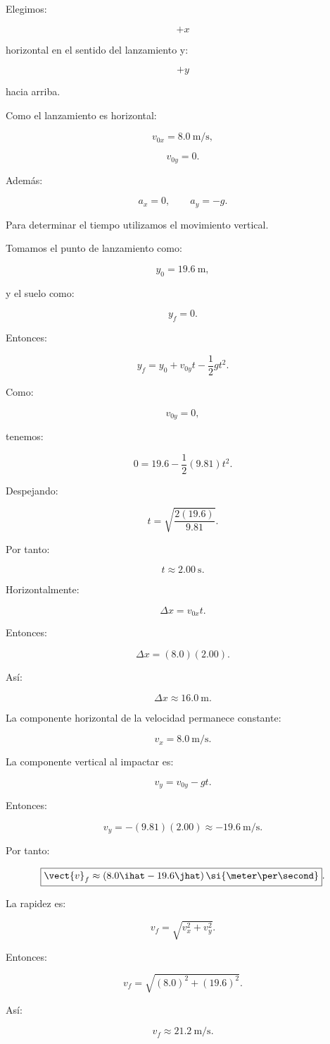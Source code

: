 \begin{explicacion}
Elegimos:

\[
+x
\]

horizontal en el sentido del lanzamiento y:

\[
+y
\]

hacia arriba.

Como el lanzamiento es horizontal:

\[
v_{0x}=\SI{8.0}{\meter\per\second},
\]

\[
v_{0y}=0.
\]

Además:

\[
a_x=0,
\qquad
a_y=-g.
\]

Para determinar el tiempo utilizamos el movimiento vertical.

Tomamos el punto de lanzamiento como:

\[
y_0=\SI{19.6}{\meter},
\]

y el suelo como:

\[
y_f=0.
\]

Entonces:

\[
y_f
=
y_0
+
v_{0y}t
-
\frac{1}{2}gt^2.
\]

Como:

\[
v_{0y}=0,
\]

tenemos:

\[
0
=
19.6
-
\frac{1}{2}(9.81)t^2.
\]

Despejando:

\[
t
=
\sqrt{
\frac{2(19.6)}{9.81}
}.
\]

Por tanto:

\[
\boxed{
t\approx\SI{2.00}{\second}
}.
\]

Horizontalmente:

\[
\Delta x=v_{0x}t.
\]

Entonces:

\[
\Delta x
=
(8.0)(2.00).
\]

Así:

\[
\boxed{
\Delta x\approx\SI{16.0}{\meter}
}.
\]

La componente horizontal de la velocidad permanece constante:

\[
\boxed{
v_x=\SI{8.0}{\meter\per\second}
}.
\]

La componente vertical al impactar es:

\[
v_y
=
v_{0y}-gt.
\]

Entonces:

\[
v_y
=
-(9.81)(2.00)
\approx
-\SI{19.6}{\meter\per\second}.
\]

Por tanto:

\[
\boxed{
\vect{v}_f
\approx
(8.0\ihat-19.6\jhat)
\,\si{\meter\per\second}
}.
\]

La rapidez es:

\[
v_f
=
\sqrt{
v_x^2+v_y^2
}.
\]

Entonces:

\[
v_f
=
\sqrt{
(8.0)^2+(19.6)^2
}.
\]

Así:

\[
\boxed{
v_f\approx\SI{21.2}{\meter\per\second}
}.
\]
\end{explicacion}



